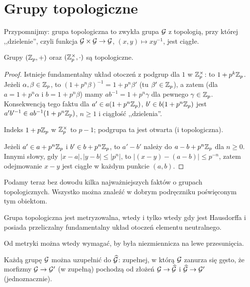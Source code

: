 \section{Grupy topologiczne}
Przypomnijmy:  grupa topologiczna to zwykła grupa $\mathcal G$ z topologią, przy której ,,dzielenie'', czyli funkcja $\mathcal G \times \mathcal G \to \mathcal G$, $(x,y) \mapsto xy^{-1}$, jest ciągłe.

\begin{fakt}
	Grupy $(\mathbb Z_p, +)$ oraz $(\mathbb Z_p^\times, \cdot)$ są topologiczne.
\end{fakt}

\begin{proof}
	Istnieje fundamentalny układ otoczeń z podgrup dla $1$ w $\mathbb Z_p^\times$: to $1 + p^k \mathbb Z_p$.
	Jeżeli $\alpha, \beta \in \mathbb Z_p$, to $(1+p^n\beta)^{-1} = 1 + p^n \beta'$ (tu $\beta' \in \mathbb Z_p$), a zatem (dla $a = 1 + p^n \alpha$ i $b = 1 + p^n \beta$) mamy $ab^{-1} = 1 + p^n \gamma$ dla pewnego $\gamma \in \mathbb Z_p$.
	Konsekwencją tego faktu dla $a' \in a(1+p^n\mathbb Z_p)$, $b' \in b(1+p^n\mathbb Z_p)$ jest $a'b'^{-1} \in ab^{-1}(1+p^n\mathbb Z_p)$, $n \ge 1$
	i ciągłość ,,dzielenia''.

	Indeks $1+p\mathbb Z_p$ w $\mathbb Z_p^\times$ to $p-1$; podgrupa ta jest otwarta (i topologiczna).

	Jeżeli $a' \in a + p^n \mathbb Z_p$ i $b' \in b + p^n \mathbb Z_p$, to $a' - b'$ należy do $a-b + p^n\mathbb Z_p$ dla $n \ge 0$.
	Innymi słowy, gdy $|x-a|,|y-b| \le |p^n|$, to $|(x-y)-(a-b)| \le p^{-n}$, zatem odejmowanie $x - y$ jest ciągłe w każdym punkcie $(a,b)$.
\end{proof}

Podamy teraz bez dowodu kilka najważniejszych faktów o grupach topologicznych.
Wszystko można znaleźć w dobrym podręczniku poświęconym tym obiektom.

\begin{fakt}
	Grupa topologiczna jest metryzowalna, wtedy i tylko wtedy gdy jest Hausdorffa i posiada przeliczalny fundamentalny układ otoczeń elementu neutralnego.
\end{fakt}

Od metryki można wtedy wymagać, by była niezmiennicza na lewe przesunięcia.

\begin{fakt}
	Każdą grupę $\mathcal G$ można uzupełnić do $\widehat {\mathcal G}$: zupełnej, w którą $\mathcal G$ zanurza się gęsto, że morfizmy $\mathcal G \to \mathcal G'$ (w zupełną) pochodzą od złożeń $\mathcal G \to \widehat {\mathcal G}$ i $\widehat {\mathcal G} \to \mathcal G'$ (jednoznacznie).
\end{fakt}

